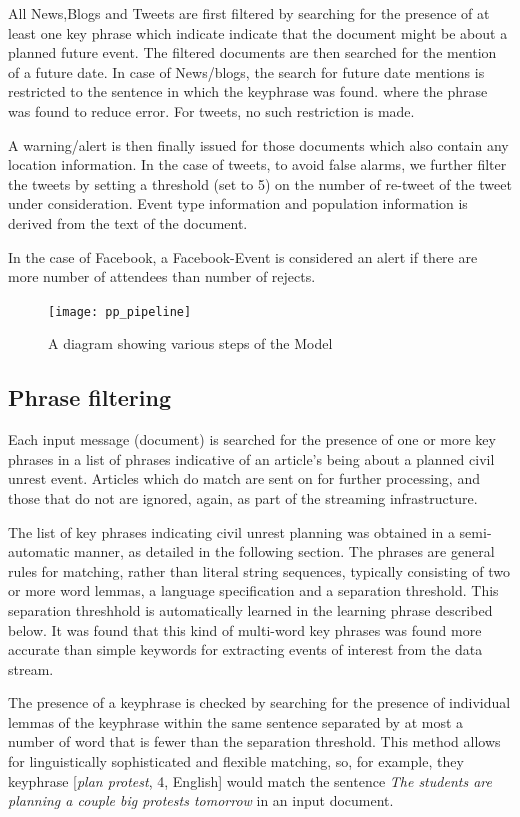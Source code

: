 
All News,Blogs and Tweets are first filtered by searching for the 
presence of at least one key phrase which indicate indicate that the document might be about a planned future event. 
The filtered documents are then searched for the mention of a future date. In case of News/blogs, 
the search for future date mentions is restricted to the sentence in which the keyphrase was found.
where the phrase was found to reduce error. For tweets, no such restriction is made.

A warning/alert is then finally issued for those documents which also contain any location information.
In the case of tweets, to avoid false alarms, we further filter the tweets by setting a threshold (set to 5) on the number of re-tweet of the tweet under consideration.  Event type information and population information is derived from the text of the document.  

In the case of Facebook, a Facebook-Event is considered an alert if there are more number of attendees than number of rejects.

\begin{figure}
\texttt{[image: pp\_pipeline]}
\caption{A diagram showing various steps of the Model}
\end{figure}

\subsection{Phrase filtering}

Each input message (document) is searched for the presence of one or
more key phrases in a list of phrases indicative of an article's being
about a planned civil unrest event.  Articles which do match are sent on for further processing,
and those that do not are ignored, again, as part of the streaming infrastructure.

The list of key phrases indicating civil unrest planning was obtained
in a semi-automatic manner, as detailed in the following section. The
phrases are general rules for matching, rather than literal string
sequences, typically consisting of two or more word lemmas, a language
specification and a separation threshold. This separation threshhold is automatically learned
in the learning phrase described below.  It was found that this kind of multi-word key phrases was found more accurate than simple
keywords for extracting events of interest from the data stream.

The presence of a keyphrase is checked by searching for the presence of
individual lemmas of the keyphrase within the same sentence separated
by at most a number of word that is fewer than the separation threshold.  
This method allows for linguistically sophisticated and flexible matching, so, for example,
they keyphrase [{\em plan protest}, 4, English] would match the sentence
{\em The students are planning a couple big protests tomorrow} in an input document.


